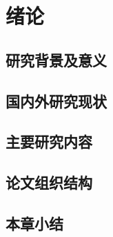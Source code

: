 \chapter{绪论}


\section{研究背景及意义}

\section{国内外研究现状}

\section{主要研究内容}

\section{论文组织结构}

\section{本章小结}
